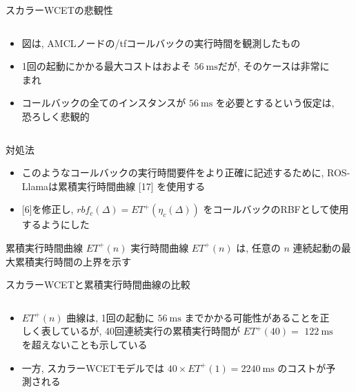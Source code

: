 \begin{frame}{スカラーWCETの悲観性}
    \begin{columns}
        \begin{column}{0.5\textwidth}
            \begin{itemize}
                \item 図は, AMCLノードの/tfコールバックの実行時間を観測したもの
                \item 1回の起動にかかる最大コストはおよそ $56 \mathrm{~ms}$だが, そのケースは非常にまれ
                \item コールバックの全てのインスタンスが $56 \mathrm{~ms}$ を必要とするという仮定は, 恐ろしく悲観的
            \end{itemize}
        \end{column}
        \begin{column}{0.5\textwidth}
        \end{column}
    \end{columns}
\end{frame}

\begin{frame}{対処法}
    \begin{itemize}
        \item このようなコールバックの実行時間要件をより正確に記述するために, ROS-Llamaは累積実行時間曲線 [17] を使用する
        \item {}[6]を修正し, $r b f_{c}(\Delta)=E T^{+}\left(\eta_{c}(\Delta)\right)$ をコールバックのRBFとして使用するようにした
    \end{itemize}
    \begin{block}{累積実行時間曲線 $E T^{+}(n)$}
        実行時間曲線 $E T^{+}(n)$ は, 任意の $n$ 連続起動の最大累積実行時間の上界を示す
    \end{block}
\end{frame}

\begin{frame}{スカラーWCETと累積実行時間曲線の比較}
    \begin{columns}
        \begin{column}{0.5\textwidth}
            \begin{itemize}
                \item $E T^{+}(n)$ 曲線は, 1回の起動に $56 \mathrm{~ms}$ までかかる可能性があることを正しく表しているが, 40回連続実行の累積実行時間が $E T^{+}(40)=$  $122 \mathrm{~ms}$ を超えないことも示している
                \item 一方, スカラーWCETモデルでは $40 \times E T^{+}(1)=2240 \mathrm{~ms}$ のコストが予測される
            \end{itemize}
        \end{column}
        \begin{column}{0.5\textwidth}
        \end{column}
    \end{columns}
\end{frame}


